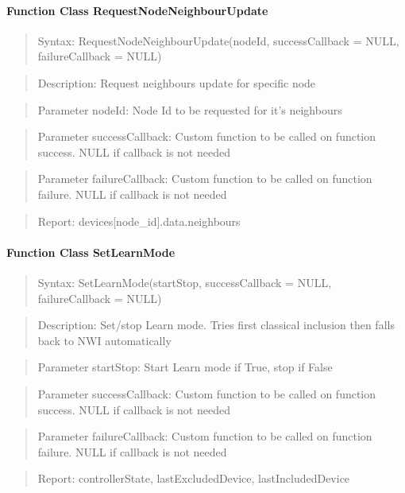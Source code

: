 \paragraph{Function Class RequestNodeNeighbourUpdate}
\begin{quote}Syntax: RequestNodeNeighbourUpdate(nodeId, successCallback = NULL, failureCallback = NULL)\end{quote}
\begin{quote}Description: Request neighbours update for specific node\end{quote}
\begin{quote}Parameter nodeId: Node Id to be requested for it's neighbours\end{quote}
\begin{quote}Parameter successCallback: Custom function to be called on function success. NULL if callback is not needed\end{quote}
\begin{quote}Parameter failureCallback: Custom function to be called on function failure. NULL if callback is not needed\end{quote}
\begin{quote}Report: devices[node\_id].data.neighbours\end{quote}

\paragraph{Function Class SetLearnMode}
\begin{quote}Syntax: SetLearnMode(startStop, successCallback = NULL, failureCallback = NULL)\end{quote}
\begin{quote}Description: Set/stop Learn mode. Tries first classical inclusion then falls back to NWI automatically\end{quote}
\begin{quote}Parameter startStop: Start Learn mode if True, stop if False\end{quote}
\begin{quote}Parameter successCallback: Custom function to be called on function success. NULL if callback is not needed\end{quote}
\begin{quote}Parameter failureCallback: Custom function to be called on function failure. NULL if callback is not needed\end{quote}
\begin{quote}Report: controllerState, lastExcludedDevice, lastIncludedDevice\end{quote}

